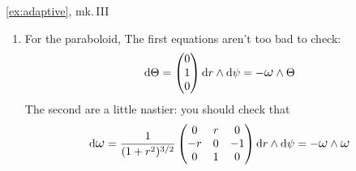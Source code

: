 \begin{examples*}{\ref{ex:adaptive}, mk.\,III}{}
\begin{enumerate}
	  \item\label{exs:paraboloidconnectionform} For the paraboloid, 
		\bigbreak
		The first equations aren't too bad to check:
		\[
			\D\Theta=\threevec 010\dr\wedge\D\psi=-\lomega\wedge\Theta
		\]
  	The second are a little nastier: you should check that
  	\begin{align*}
  		\D\lomega
			=
			\frac 1{(1+r^2)^{3/2}}
			\begin{pmatrix}
				0&r&0\\
				-r&0&-1\\
				0&1&0
			\end{pmatrix}
			\dr\wedge\D\psi =-\lomega\wedge\lomega 
  	\end{align*}
	\end{enumerate}
\end{examples*}


% 

